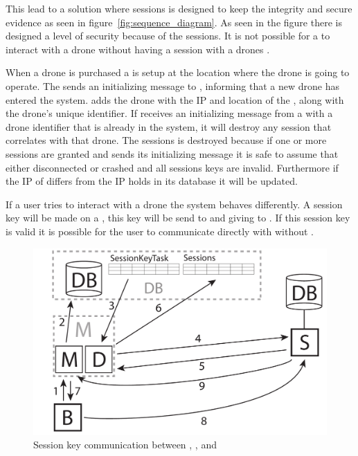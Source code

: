 This lead to a solution where sessions is designed to keep the integrity and secure evidence as seen in figure~\ref{fig:sequence_diagram}. 
As seen in the figure there is designed a level of security because of the sessions. It is not possible for a  to interact with a drone without having a session with a drones .

When a drone is purchased a  is setup at the location where the drone is going to operate.
The  sends an initializing message to , informing  that a new drone has entered the system.
 adds the drone with the IP and location of the , along with the drone's unique identifier.
If  receives an initializing message from a  with a drone identifier that is already in the system, it will destroy any session that correlates with that drone. The sessions is destroyed because if one or more sessions are granted and  sends its initializing message it is safe to assume that  either disconnected or crashed and all sessions keys are invalid.
Furthermore if the IP of  differs from the IP  holds in its database it will be updated.

If a user tries to interact with a drone the system behaves differently. A session key will be made on a , this key will be send to  and giving to . If this session key is valid it is possible for the user to communicate directly with  without .

\begin{figure}[!h]
    \centering 
    \includegraphics[width=\textwidth]{gfx/sessionkey_communication.pdf}
    \caption{Session key communication between , , and }
    \label{fig:sessionkey_communication}
\end{figure}


